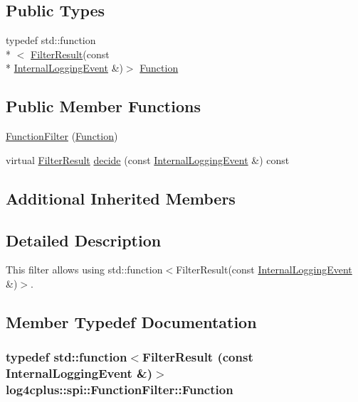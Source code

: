 \subsection*{Public Types}
\begin{DoxyCompactItemize}
\item 
typedef std\-::function\\*
$<$ \hyperlink{namespacelog4cplus_1_1spi_aa910f475d36c00f943ef78e37d11e3f6}{Filter\-Result}(const \\*
\hyperlink{classlog4cplus_1_1spi_1_1InternalLoggingEvent}{Internal\-Logging\-Event} \&)$>$ \hyperlink{classlog4cplus_1_1spi_1_1FunctionFilter_a14d3ac58dd1abb4816b4cc22536eee50}{Function}
\end{DoxyCompactItemize}
\subsection*{Public Member Functions}
\begin{DoxyCompactItemize}
\item 
\hyperlink{classlog4cplus_1_1spi_1_1FunctionFilter_aac161f1899eb48d2815c8d3d588b81cc}{Function\-Filter} (\hyperlink{classlog4cplus_1_1spi_1_1FunctionFilter_a14d3ac58dd1abb4816b4cc22536eee50}{Function})
\item 
virtual \hyperlink{namespacelog4cplus_1_1spi_aa910f475d36c00f943ef78e37d11e3f6}{Filter\-Result} \hyperlink{classlog4cplus_1_1spi_1_1FunctionFilter_a0c68a83fdb63980ec7da8419988e1e81}{decide} (const \hyperlink{classlog4cplus_1_1spi_1_1InternalLoggingEvent}{Internal\-Logging\-Event} \&) const 
\end{DoxyCompactItemize}
\subsection*{Additional Inherited Members}


\subsection{Detailed Description}
This filter allows using {\ttfamily std\-::function$<$Filter\-Result(const \hyperlink{classlog4cplus_1_1spi_1_1InternalLoggingEvent}{Internal\-Logging\-Event} \&)$>$}. 

\subsection{Member Typedef Documentation}
\hypertarget{classlog4cplus_1_1spi_1_1FunctionFilter_a14d3ac58dd1abb4816b4cc22536eee50}{
\subsubsection[{Function}]{\setlength{\rightskip}{0pt plus 5cm}typedef std\-::function$<${\bf Filter\-Result} (const {\bf Internal\-Logging\-Event} \&)$>$ {\bf log4cplus\-::spi\-::\-Function\-Filter\-::\-Function}}}\label{classlog4cplus_1_1spi_1_1FunctionFilter_a14d3ac58dd1abb4816b4cc22536eee50}


